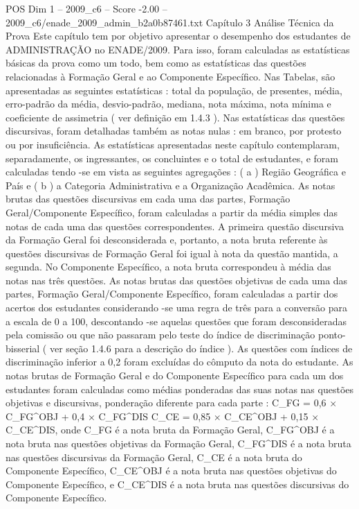 \begin{textsample}{POS Dim 1 – 2009\_c6 – Score -2.00 – 2009\_c6/enade\_2009\_admin\_b2a0b87461.txt}  \label{ex:f1_pos_227}
Capítulo 3 Análise Técnica da Prova Este capítulo tem por objetivo apresentar o desempenho dos estudantes de ADMINISTRAÇÃO no ENADE/2009.
Para isso, foram calculadas as estatísticas básicas da prova como um todo, bem como as estatísticas das questões relacionadas à Formação Geral e ao Componente Específico.
Nas Tabelas, são apresentadas as seguintes estatísticas : total da população, de presentes, média, erro-padrão da média, desvio-padrão, mediana, nota máxima, nota mínima e coeficiente de assimetria ( ver definição em 1.4.3 ).
Nas estatísticas das questões discursivas, foram detalhadas também as notas nulas : em branco, por protesto ou por insuficiência.
As estatísticas apresentadas neste capítulo contemplaram, separadamente, os ingressantes, os concluintes e o total de estudantes, e foram calculadas tendo -se em vista as seguintes agregações : ( a ) Região Geográfica e País e ( b ) a Categoria Administrativa e a Organização Acadêmica.
As notas brutas das questões discursivas em cada uma das partes, Formação Geral/Componente Específico, foram calculadas a partir da média simples das notas de cada uma das questões correspondentes.
A primeira questão discursiva da Formação Geral foi desconsiderada e, portanto, a nota bruta referente às questões discursivas de Formação Geral foi igual à nota da questão mantida, a segunda.
No Componente Específico, a nota bruta correspondeu à média das notas nas três questões.
As notas brutas das questões objetivas de cada uma das partes, Formação Geral/Componente Específico, foram calculadas a partir dos acertos dos estudantes considerando -se uma regra de três para a conversão para a escala de 0 a 100, descontando -se aquelas questões que foram desconsideradas pela comissão ou que não passaram pelo teste do índice de discriminação ponto-bisserial ( ver seção 1.4.6 para a descrição do índice ).
As questões com índices de discriminação inferior a 0,2 foram excluídas do cômputo da nota do estudante.
As notas brutas de Formação Geral e do Componente Específico para cada um dos estudantes foram calculadas como médias ponderadas das suas notas nas questões objetivas e discursivas, ponderação diferente para cada parte : C\_FG = 0,6 × C\_FG\textasciicircum{}OBJ + 0,4 × C\_FG\textasciicircum{}DIS C\_CE = 0,85 × C\_CE\textasciicircum{}OBJ + 0,15 × C\_CE\textasciicircum{}DIS, onde C\_FG é a nota bruta da Formação Geral, C\_FG\textasciicircum{}OBJ é a nota bruta nas questões objetivas da Formação Geral, C\_FG\textasciicircum{}DIS é a nota bruta nas questões discursivas da Formação Geral, C\_CE é a nota bruta do Componente Específico, C\_CE\textasciicircum{}OBJ é a nota bruta nas questões objetivas do Componente Específico, e C\_CE\textasciicircum{}DIS é a nota bruta nas questões discursivas do Componente Específico.

\end{textsample}
